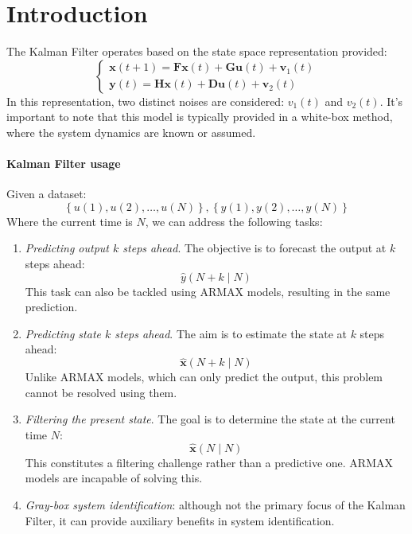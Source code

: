 \section{Introduction}

The Kalman Filter operates based on the state space representation provided:
\[\begin{cases}
    \mathbf{x}(t+1)=\mathbf{Fx}(t)+\mathbf{Gu}(t)+\mathbf{v}_1(t) \\
    \mathbf{y}(t)=\mathbf{Hx}(t)+\mathbf{Du}(t)+\mathbf{v}_2(t)
\end{cases}\]
In this representation, two distinct noises are considered: $v_1(t)$ and $v_2(t)$. 
It's important to note that this model is typically provided in a white-box method, where the system dynamics are known or assumed.

\paragraph*{Kalman Filter usage}
Given a dataset:
\[\left\{ u(1),u(2),\dots,u(N)\right\},\left\{ y(1),y(2),\dots,y(N)\right\}\]
Where the current time is $N$, we can address the following tasks:
\begin{enumerate}
    \item \textit{Predicting output $k$ steps ahead}. 
        The objective is to forecast the output at $k$ steps ahead:
        \[\hat{y}(N+k\mid N)\]
        This task can also be tackled using ARMAX models, resulting in the same prediction.
    \item \textit{Predicting state $k$ steps ahead}.
        The aim is to estimate the state at $k$ steps ahead:
        \[\hat{\mathbf{x}}(N+k\mid N)\]
        Unlike ARMAX models, which can only predict the output, this problem cannot be resolved using them.
    \item \textit{Filtering the present state}. 
        The goal is to determine the state at the current time $N$:
        \[\hat{\mathbf{x}}(N\mid N)\]
        This constitutes a filtering challenge rather than a predictive one. 
        ARMAX models are incapable of solving this.
    \item \textit{Gray-box system identification}: although not the primary focus of the Kalman Filter, it can provide auxiliary benefits in system identification.
\end{enumerate}

